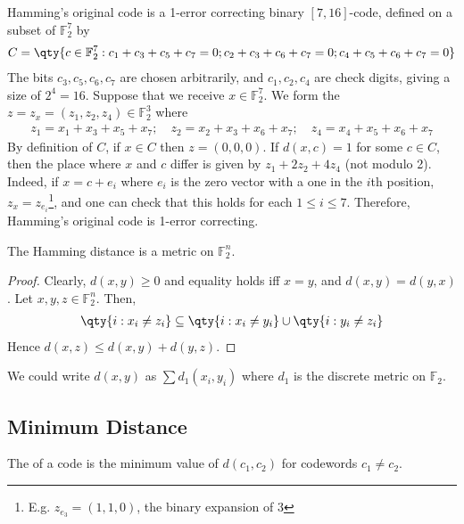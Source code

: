 \begin{example}
    Hamming's original code is a 1-error correcting binary $[7,16]$-code, defined on a subset of $\mathbb F_2^7$ by
    \begin{align*}
        C = \qty{c \in \mathbb F_2^7 : c_1 + c_3 + c_5 + c_7 = 0; c_2 + c_3 + c_6 + c_7 = 0; c_4 + c_5 + c_6 + c_7 = 0}
    \end{align*}
    The bits $c_3, c_5, c_6, c_7$ are chosen arbitrarily, and $c_1, c_2, c_4$ are check digits, giving a size of $2^4 = 16$.
    Suppose that we receive $x \in \mathbb F_2^7$.
    We form the  $z = z_x = (z_1, z_2, z_4) \in \mathbb F_2^3$ where
    \begin{align*}
        z_1 = x_1 + x_3 + x_5 + x_7;\quad z_2 = x_2 + x_3 + x_6 + x_7;\quad z_4 = x_4 + x_5 + x_6 + x_7
    \end{align*}
    By definition of $C$, if $x \in C$ then $z = (0, 0, 0)$.
    If $d(x,c) = 1$ for some $c \in C$, then the place where $x$ and $c$ differ is given by $z_1 + 2z_2 + 4z_4$ (not modulo 2).
    Indeed, if $x = c + e_i$ where $e_i$ is the zero vector with a one in the $i$th position, $z_x = z_{e_i}$\footnote{E.g. $z_{e_3} = (1, 1, 0)$, the binary expansion of $3$}, and one can check that this holds for each $1 \leq i \leq 7$.
    Therefore, Hamming's original code is 1-error correcting.
\end{example}

\begin{lemma}
    The Hamming distance is a metric on $\mathbb F_2^n$.
\end{lemma}

\begin{proof}
    Clearly, $d(x,y) \geq 0$ and equality holds iff $x = y$, and $d(x,y) = d(y,x)$.
    Let $x, y, z \in \mathbb F_2^n$.
    Then,
    \begin{align*}
        \qty{i : x_i \neq z_i} \subseteq \qty{i : x_i \neq y_i} \cup \qty{i : y_i \neq z_i}
    \end{align*}
    Hence $d(x,z) \leq d(x,y) + d(y,z)$.
\end{proof}
\begin{remark}
    We could write $d(x,y)$ as $\sum d_1(x_i,y_i)$ where $d_1$ is the discrete metric on $\mathbb F_2$.
\end{remark}

\subsection{Minimum Distance}
\begin{definition}
    The  of a code is the minimum value of $d(c_1, c_2)$ for codewords $c_1 \neq c_2$.
\end{definition}


